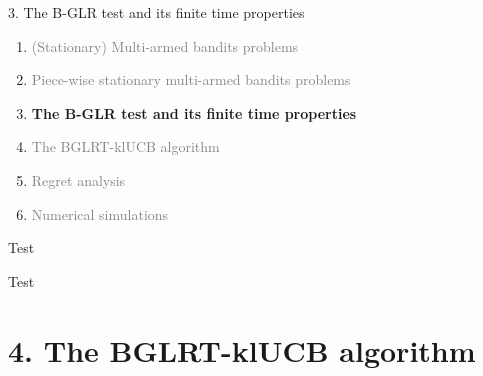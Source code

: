 \documentclass[11pt,english,ignorenonframetext,]{beamer}
\begin{document}
\begin{frame}{3. The B-GLR test and its finite time properties}

  \begin{enumerate}
    \item
    \textcolor{gray}{
      (Stationary) Multi-armed bandits problems
    }
    \vspace*{15pt}

    \item
    \textcolor{gray}{
      Piece-wise stationary multi-armed bandits problems
    }
    \vspace*{15pt}

    \item
    \alert{\textbf{%
      The B-GLR test and its finite time properties
    }}
    \vspace*{15pt}

    \item
    \textcolor{gray}{
      The BGLRT-klUCB algorithm
    }
    \vspace*{15pt}

    \item
    \textcolor{gray}{
      Regret analysis
    }
    \vspace*{15pt}

    \item
    \textcolor{gray}{
      Numerical simulations
    }
  \end{enumerate}

\end{frame}

\begin{frame}{Test}

  Test

\end{frame}


\section{\hfill{}4. The BGLRT-klUCB algorithm\hfill{}}
\end{document}
